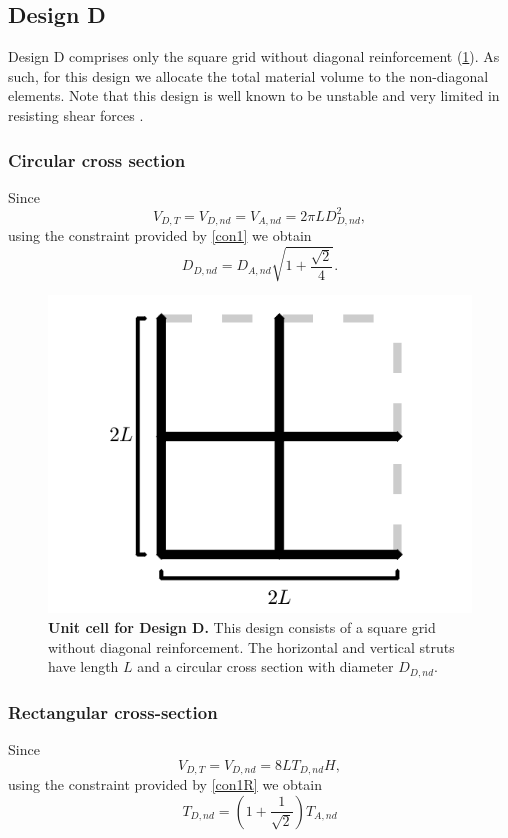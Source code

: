 \documentclass[10pt,twoside]{fernandes_supp}
\begin{document}
\subsection{Design D} 
Design D comprises only the square grid without diagonal reinforcement (\cref{DesignD}). As such, for this design we allocate the total material volume to the non-diagonal elements. Note that this design is well known to be unstable and very limited in resisting shear forces \citep{gibson1999,deshpande2001}.

\subsubsection{Circular cross section}
Since
\begin{equation}
V_{D,T}=V_{D,nd}=V_{A,nd}=2\pi L D_{D,nd}^2,
\end{equation}
using the constraint provided by \cref{con1} we obtain
\begin{equation}
{D_{D,nd}}={D_{A,nd}}\sqrt{1+\frac{\sqrt{2}}{4}}. 
\end{equation}

\begin{figure}[H]
    \centering
    \includegraphics[width=0.4\linewidth]{SFig5.png}
    \caption{{\bf Unit cell for Design D.} This design consists of a square grid without diagonal reinforcement.  The horizontal and vertical struts have length $L$ and a circular cross section with diameter $D_{D,nd}$.}
    \label{DesignD}
\end{figure}

\subsubsection{Rectangular cross-section}
Since
\begin{equation}
V_{D,T}=V_{D,nd}=8 L T_{D,nd} H,
\end{equation}
using the constraint provided by \cref{con1R} we obtain
\begin{equation}
	T_{D,nd}=\left(1+\frac{1}{\sqrt{2}}\right)T_{A,nd}
\end{equation}
\end{document}
